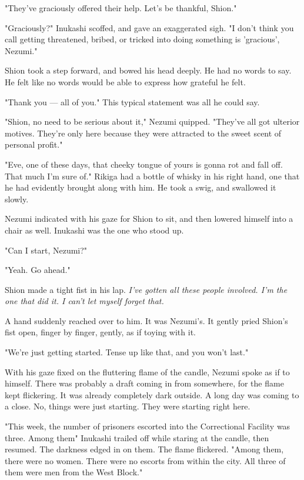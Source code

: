 "They've graciously offered their help. Let's be thankful, Shion."

"Graciously?" Inukashi scoffed, and gave an exaggerated sigh. "I don't
think you call getting threatened, bribed, or tricked into doing
something is 'gracious', Nezumi."

Shion took a step forward, and bowed his head deeply. He had no words to
say. He felt like no words would be able to express how grateful he
felt.

"Thank you --- all of you." This typical statement was all he could say.

"Shion, no need to be serious about it," Nezumi quipped. "They've all
got ulterior motives. They're only here because they were attracted to
the sweet scent of personal profit."

"Eve, one of these days, that cheeky tongue of yours is gonna rot and
fall off. That much I'm sure of." Rikiga had a bottle of whisky in his
right hand, one that he had evidently brought along with him. He took a
swig, and swallowed it slowly.

Nezumi indicated with his gaze for Shion to sit, and then lowered
himself into a chair as well. Inukashi was the one who stood up.

"Can I start, Nezumi?"

"Yeah. Go ahead."

Shion made a tight fist in his lap. \emph{I've gotten all these people
involved. I'm the one that did it. I can't let myself forget that.}

A hand suddenly reached over to him. It was Nezumi's. It gently pried
Shion's fist open, finger by finger, gently, as if toying with it.

"We're just getting started. Tense up like that, and you won't last."

With his gaze fixed on the fluttering flame of the candle, Nezumi spoke
as if to himself. There was probably a draft coming in from somewhere,
for the flame kept flickering. It was already completely dark outside. A
long day was coming to a close. No, things were just starting. They were
starting right here.

"This week, the number of prisoners escorted into the Correctional
Facility was three. Among them\el " Inukashi trailed off while staring at
the candle, then resumed. The darkness edged in on them. The flame
flickered. "Among them, there were no women. There were no escorts from
within the city. All three of them were men from the West Block."

